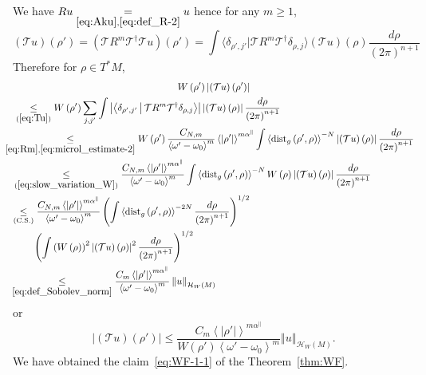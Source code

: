 \documentclass[10pt]{amsart}
\theoremstyle{definition}\newtheorem{defi}[theo]{Definition}\newtheorem{rema}[theo]{Remark}\newtheorem{exam}[theo]{Example}\newtheorem{exem}[theo]{Example}\newtheorem{nota}[theo]{Notation}
\newcommand*\ineq[1]{\underset{(#1)}{\leq}}
\newcommand{\clT}{\mathcal{T}}
\newcommand{\clH}{\mathcal{H}}
\newcommand{\dist}{\mathrm{dist}}
\begin{document}
We have $Ru\underset{\eqref{eq:Aku},\eqref{eq:def_R-2}}{=}u$ hence for any $m\geq1$,
\begin{equation}\label{eq:Tu}
\left(\clT u\right)\left(\rho'\right)=\left(\clT R^{m}\clT^{\dagger}\clT u\right)\left(\rho'\right)=\int\langle\delta_{\rho',j'}|\clT R^{m}\clT^{\dagger}\delta_{\rho,j}\rangle\left(\clT u\right)\left(\rho\right)\frac{d\rho}{\left(2\pi\right)^{n+1}}
\end{equation}
Therefore for $\rho\in T^{*}M$,
\begin{multline*}
W\left(\rho'\right)\left|\left(\clT u\right)\left(\rho'\right)\right|\\
\begin{aligned}
& \ineq{\ref{eq:Tu}}W\left(\rho'\right)\sum_{j,j'}\int\left|\left\langle\delta_{\rho',j'}\,\middle|\,\clT R^{m}\clT^{\dagger}\delta_{\rho,j}\right\rangle\right|\left|\left(\clT u\right)\left(\rho\right)\right|\frac{d\rho}{\left(2\pi\right)^{n+1}}\\
& \mkern-20mu\underset{\eqref{eq:Rm},\eqref{eq:microl_estimate-2}}{\leq}W\left(\rho'\right)\frac{C_{N,m}}{\left\langle \omega'-\omega_{0}\right\rangle ^{m}}\left\langle \left|\rho'\right|\right\rangle ^{m\alpha^{\parallel}}\int\left\langle \dist_{g}\left(\rho',\rho\right)\right\rangle ^{-N}\left|\left(\clT u\right)\left(\rho\right)\right|\frac{d\rho}{\left(2\pi\right)^{n+1}}\\
& \mkern-3mu\ineq{\ref{eq:slow_variation_W}}\frac{C_{N,m}\left\langle \left|\rho'\right|\right\rangle ^{m\alpha^{\parallel}}}{\left\langle \omega'-\omega_{0}\right\rangle ^{m}}\int\left\langle \dist_{g}\left(\rho',\rho\right)\right\rangle ^{-N}W\left(\rho\right)\left|\left(\clT u\right)\left(\rho\right)\right|\frac{d\rho}{\left(2\pi\right)^{n+1}}\\
& \mkern-5mu\ineq{\mathrm{C.S.}}\frac{C_{N,m}\left\langle \left|\rho'\right|\right\rangle ^{m\alpha^{\parallel}}}{\left\langle \omega'-\omega_{0}\right\rangle ^{m}}\left(\int\left\langle \dist_{g}\left(\rho',\rho\right)\right\rangle ^{-2N}\frac{d\rho}{\left(2\pi\right)^{n+1}}\right)^{1/2}\\
& \qquad\left(\int\left(W\left(\rho\right)\right)^{2}\left|\left(\clT u\right)\left(\rho\right)\right|^{2}\frac{d\rho}{\left(2\pi\right)^{n+1}}\right)^{1/2}\\
& \mkern-07mu\underset{\eqref{eq:def_Sobolev_norm}}{\leq}\frac{C_{m}\left\langle \left|\rho'\right|\right\rangle ^{m\alpha^{\parallel}}}{\left\langle \omega'-\omega_{0}\right\rangle ^{m}}\left\Vert u\right\Vert _{\clH _{W}\left(M\right)}
\end{aligned}
\end{multline*}
or
\begin{equation}\label{eq:res-1-1}
\left|\left(\clT u\right)\left(\rho'\right)\right|\leq\frac{C_{m}\left\langle \left|\rho'\right|\right\rangle ^{m\alpha^{\parallel}}}{W\left(\rho'\right)\left\langle \omega'-\omega_{0}\right\rangle ^{m}}\left\Vert u\right\Vert _{\clH _{W}\left(M\right)}.
\end{equation}
We have obtained the claim~\eqref{eq:WF-1-1} of the Theorem~\ref{thm:WF}.
\end{document}
